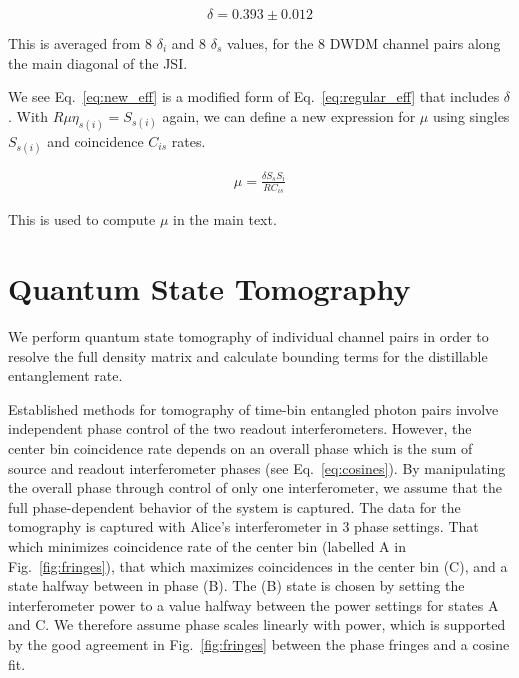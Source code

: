 \documentclass[11pt]{caltech_thesis} %
\begin{document}
$$\delta = 0.393 \pm 0.012$$

This is averaged from 8 $\delta_i$ and 8 $\delta_s$ values, for the 8 DWDM channel pairs along the main diagonal of the JSI.

We see Eq.~\ref{eq:new_eff} is a modified form of Eq.~\ref{eq:regular_eff} that includes $\delta$. With $R \mu \eta_{s(i)}=S_{s(i)}$ again, we can define a new expression for $\mu$ using singles $S_{s(i)}$ and coincidence $C_{is}$ rates.

\hypertarget{eq:new_mu}{}{
\begin{align}
    \mu = \frac{\delta S_s S_i }{R C_{is}} \label{new_mu}
\end{align}
}

This is used to compute $\mu$ in the main text.

\hypertarget{quantum-state-tomography}{%
\section{Quantum State Tomography}\label{quantum-state-tomography}}

We perform quantum state tomography of individual channel pairs in order to resolve the full density matrix and calculate bounding terms for the distillable entanglement rate.

Established methods for tomography of time-bin entangled photon pairs involve independent phase control of the two readout interferometers. However, the center bin coincidence rate depends on an overall phase which is the sum of source and readout interferometer phases (see Eq.~\ref{eq:cosines}). By manipulating the overall phase through control of only one interferometer, we assume that the full phase-dependent behavior of the system is captured. The data for the tomography is captured with Alice's interferometer in 3 phase settings. That which minimizes coincidence rate of the center bin (labelled A in Fig.~\ref{fig:fringes}), that which maximizes coincidences in the center bin (C), and a state halfway between in phase (B). The (B) state is chosen by setting the interferometer power to a value halfway between the power settings for states A and C. We therefore assume phase scales linearly with power, which is supported by the good agreement in Fig.~\ref{fig:fringes} between the phase fringes and a cosine fit.
\end{document}
